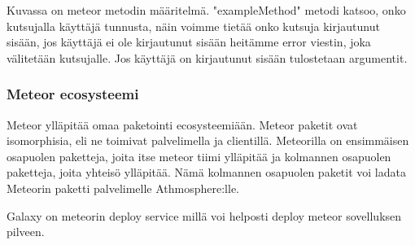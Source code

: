 \documentclass[11pt,a4paper,titlepage,oneside]{article}
\begin{document}
Kuvassa on meteor metodin määritelmä. "exampleMethod"{} metodi katsoo, onko kutsujalla käyttäjä tunnusta, näin voimme tietää onko kutsuja kirjautunut sisään,
jos käyttäjä ei ole kirjautunut sisään heitämme error viestin, joka välitetään kutsujalle.
Jos käyttäjä on kirjautunut sisään tulostetaan argumentit. 

\medskip




\subsubsection{Meteor ecosysteemi}




Meteor ylläpitää omaa paketointi ecosysteemiään.
Meteor paketit ovat isomorphisia, eli ne toimivat palvelimella ja clientillä.
Meteorilla on ensimmäisen osapuolen paketteja, joita itse meteor tiimi ylläpitää ja kolmannen osapuolen paketteja,
joita yhteisö ylläpitää. Nämä kolmannen osapuolen paketit voi ladata Meteorin paketti palvelimelle Athmosphere:lle.



\medskip


Galaxy on meteorin deploy service millä voi helposti deploy meteor sovelluksen pilveen.







\newpage
{}%






\newpage
{}        %
\end{document}
